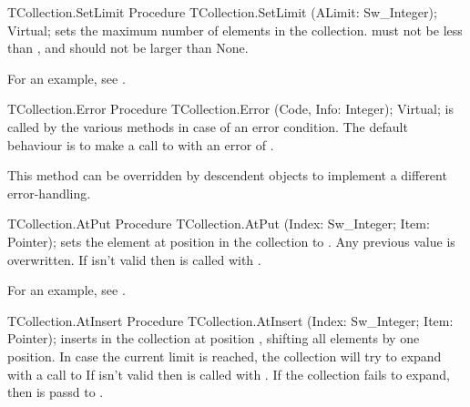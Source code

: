 \html{}


\begin{procedure}{TCollection.SetLimit}
\Declaration
Procedure TCollection.SetLimit (ALimit: Sw\_Integer); Virtual;
\Description
{} sets the maximum number of elements in the collection.
 must not be less than , and should not be larger
than 
\Errors
None.
\SeeAlso
{}
\end{procedure}

For an example, see .

\begin{procedure}{TCollection.Error}
\Declaration
Procedure TCollection.Error (Code, Info: Integer); Virtual;
\Description
{} is called by the various  methods
in case of an error condition. The default behaviour is to make
a call to  with an error of .

This method can be overridden by descendent objects to implement
a different error-handling.
\Errors
\SeeAlso
{}
\end{procedure}

\begin{procedure}{TCollection.AtPut}
\Declaration
Procedure TCollection.AtPut (Index: Sw\_Integer; Item: Pointer);
\Description
{} sets the element at position  in the collection
to . Any previous value is overwritten.
\Errors
If  isn't valid then  is called
with .
\SeeAlso
\end{procedure}

For an example, see .

\begin{procedure}{TCollection.AtInsert}
\Declaration
Procedure TCollection.AtInsert (Index: Sw\_Integer; Item: Pointer);
\Description
{} inserts  in the collection at position ,
shifting all elements by one position. In case the current limit is reached,
the collection will try to expand with a call to 
\Errors
If  isn't valid then  is called
with . If the collection fails to expand, then
 is passd to .
\SeeAlso
{}
\end{procedure}



